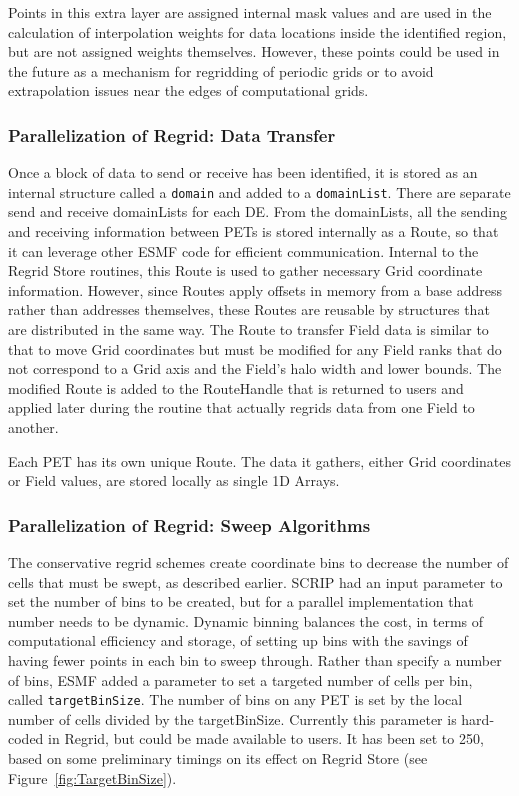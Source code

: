 Points in this extra layer are assigned internal mask values and are used in the
calculation of interpolation weights for data locations inside the identified
region, but are not assigned weights themselves.  However, these points could be
used in the future as a mechanism for regridding of periodic grids or to avoid
extrapolation issues near the edges of computational grids.

\subsubsection{Parallelization of Regrid: Data Transfer}
Once a block of data to send or receive has been identified, it is stored as an
internal structure called a {\tt domain} and added to a {\tt domainList}.  There
are separate send and receive domainLists for each DE.  From the domainLists,
all the sending and receiving information between PETs is stored internally as a
Route, so that it can leverage other ESMF code for efficient communication.
Internal to the Regrid Store routines, this Route is used to gather necessary
Grid coordinate information.  However, since Routes apply offsets in memory from
a base address rather than addresses themselves, these Routes are reusable by
structures that are distributed in the same way.  The Route to transfer Field
data is similar to that to move Grid coordinates but must be modified for any
Field ranks that do not correspond to a Grid axis and the Field's halo width and
lower bounds.   The modified Route is added to the RouteHandle that is returned
to users and applied later during the routine that actually regrids data from
one Field to another.

Each PET has its own unique Route.  The data it gathers, either Grid coordinates
or Field values, are stored locally as single 1D Arrays.


\subsubsection{Parallelization of Regrid: Sweep Algorithms}
The conservative regrid schemes create coordinate bins to decrease the
number of cells that must be swept, as described earlier.  SCRIP
had an input parameter to set the number of bins to be created, but for a
parallel implementation that number needs to be dynamic.  Dynamic binning
balances the cost, in terms of computational efficiency and storage, of setting
up bins with the savings of having fewer points in each bin to sweep through.  
Rather than specify a number of bins, ESMF added a parameter to set a targeted
number of cells per bin, called {\tt targetBinSize}.  The number of bins on any
PET is set by the local number of cells divided by the targetBinSize.  Currently
this parameter is hard-coded in Regrid, but could be made available to users.
It has been set to 250, based on some preliminary timings on its effect on
Regrid Store (see Figure~\ref{fig:TargetBinSize}).

